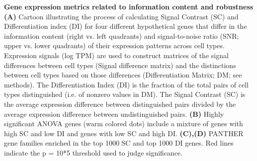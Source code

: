 \textbf{Gene expression metrics related to information content and robustness} \textbf{(A)} Cartoon illustrating the process of calculating Signal Contrast (SC) and Differentiation index (DI) for four different hypothetical genes that differ in the information content (right vs. left quadrants) and signal-to-noise ratio (SNR; upper vs. lower quadrants) of their expression patterns across cell types. Expression signals (log TPM) are used to construct matrices of the signal differences between cell types (Signal difference matrix) and the distinctions between cell types based on those differences (Differentiation Matrix; DM; see methods). The Differentiation Index (DI) is the fraction of the total pairs of cell types distinguished (i.e. of nonzero values in DM). The Signal Contrast (SC) is the average expression difference between distinguished pairs divided by the average expression difference between undistinguished pairs. \textbf{(B)} Highly significant ANOVA genes (warm colored dots) include a mixture of genes with high SC and low DI and genes with low SC and high DI. \textbf{(C),(D)} PANTHER gene families enriched in the top 1000 SC and top 1000 DI genes. Red lines indicate the p = 10*5 threshold used to judge significance. 